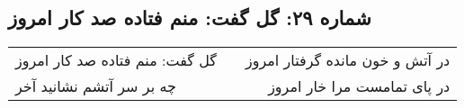\begin{center}
\section*{شماره ۲۹: گل گفت: منم فتاده صد کار امروز}
\label{sec:029}
\begin{longtable}{l p{0.5cm} r}
گل گفت: منم فتاده صد کار امروز
&&
در آتش و خون مانده گرفتار امروز
\\
چه بر سر آتشم نشانید آخر
&&
در پای تمامست مرا خار امروز
\\
\end{longtable}
\end{center}
